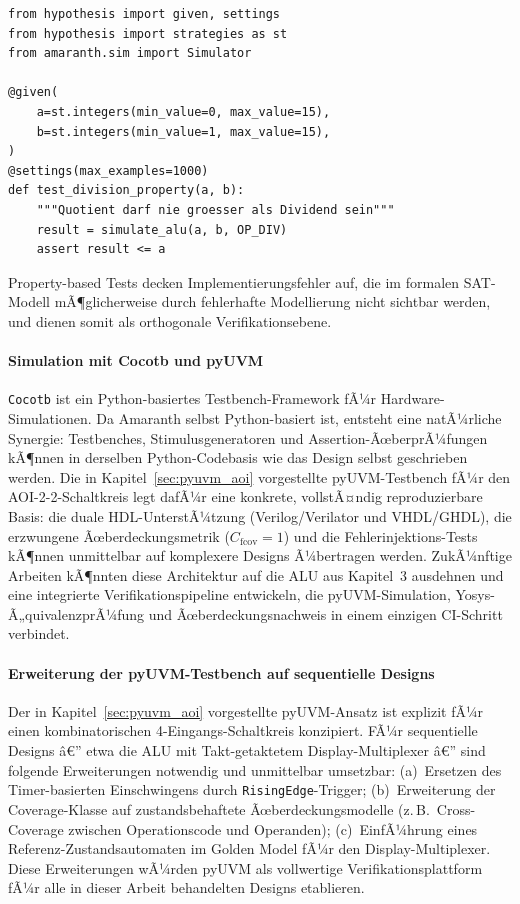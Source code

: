 ﻿\documentclass[12pt,a4paper]{report}
\begin{document}
\begin{lstlisting}[style=pythonstyle, caption={Hypothesis-basierter ALU-Test}]
from hypothesis import given, settings
from hypothesis import strategies as st
from amaranth.sim import Simulator

@given(
    a=st.integers(min_value=0, max_value=15),
    b=st.integers(min_value=1, max_value=15),
)
@settings(max_examples=1000)
def test_division_property(a, b):
    """Quotient darf nie groesser als Dividend sein"""
    result = simulate_alu(a, b, OP_DIV)
    assert result <= a
\end{lstlisting}

Property-based Tests decken Implementierungsfehler auf, die im formalen SAT-Modell
mÃ¶glicherweise durch fehlerhafte Modellierung nicht sichtbar werden, und dienen somit
als orthogonale Verifikationsebene.

\paragraph{Simulation mit Cocotb und pyUVM}
\texttt{Cocotb} \cite{cocotb2024} ist ein Python-basiertes Testbench-Framework fÃ¼r
Hardware-Simulationen. Da Amaranth selbst Python-basiert ist, entsteht eine natÃ¼rliche
Synergie: Testbenches, Stimulusgeneratoren und Assertion-ÃœberprÃ¼fungen kÃ¶nnen in
derselben Python-Codebasis wie das Design selbst geschrieben werden. Die in
Kapitel~\ref{sec:pyuvm_aoi} vorgestellte pyUVM-Testbench fÃ¼r den AOI-2-2-Schaltkreis
legt dafÃ¼r eine konkrete, vollstÃ¤ndig reproduzierbare Basis: die duale
HDL-UnterstÃ¼tzung (Verilog/Verilator und VHDL/GHDL), die erzwungene
Ãœberdeckungsmetrik ($C_{\mathrm{fcov}} = 1$) und die Fehlerinjektions-Tests
kÃ¶nnen unmittelbar auf komplexere Designs Ã¼bertragen werden.
ZukÃ¼nftige Arbeiten kÃ¶nnten diese Architektur auf die ALU aus Kapitel~3 ausdehnen
und eine integrierte Verifikationspipeline entwickeln, die pyUVM-Simulation,
Yosys-Ã„quivalenzprÃ¼fung und Ãœberdeckungsnachweis in einem einzigen CI-Schritt
verbindet.

\paragraph{Erweiterung der pyUVM-Testbench auf sequentielle Designs}
Der in Kapitel~\ref{sec:pyuvm_aoi} vorgestellte pyUVM-Ansatz ist explizit fÃ¼r einen
kombinator\-ischen 4-Eingangs-Schaltkreis konzipiert. FÃ¼r sequentielle Designs â€”
etwa die ALU mit Takt-getaktetem Display-Multiplexer â€” sind folgende Erweiterungen
notwendig und unmittelbar umsetzbar: (a)~Ersetzen des Timer-basierten Einschwingens
durch \texttt{RisingEdge}-Trigger; (b)~Erweiterung der Coverage-Klasse auf
zustandsbehaftete Ãœberdeckungsmodelle (z.\,B.\ Cross-Coverage zwischen Operationscode
und Operanden); (c)~EinfÃ¼hrung eines Referenz-Zustandsautomaten im Golden Model fÃ¼r
den Display-Multiplexer. Diese Erweiterungen wÃ¼rden pyUVM als vollwertige
Verifikationsplattform fÃ¼r alle in dieser Arbeit behandelten Designs etablieren.
\end{document}
